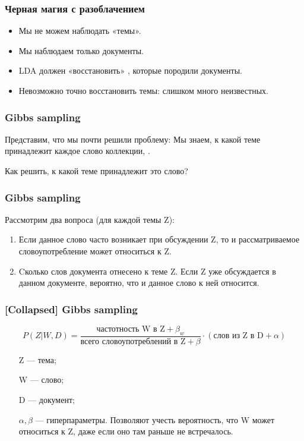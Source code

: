 \documentclass[10pt,svgnames]{beamer}
\begin{document}
\begin{frame}
  \frametitle{Черная магия с разоблачением}
  \begin{itemize}
  \item Мы не можем наблюдать «темы».
  \item Мы наблюдаем только документы.
  \item LDA должен «восстановить» , которые
    породили документы.
  \item Невозможно точно восстановить темы: слишком много неизвестных.
  \end{itemize}
\end{frame}

\begin{frame}
  \frametitle{Gibbs sampling}
  \begin{block}{Представим, что мы почти решили проблему:}
    Мы знаем, к какой теме принадлежит каждое слово коллекции,
    . 
  \end{block}
  
  Как решить, к какой теме принадлежит это слово?
\end{frame}

\begin{frame}
  \frametitle{Gibbs sampling}
  Рассмотрим два вопроса (для каждой темы Z):
  \begin{enumerate}
  \item {}

    Если данное слово часто возникает при обсуждении Z, то и
    рассматриваемое словоупотребление может относиться к Z.
  \item {} 

    Cколько слов документа отнесено к теме Z. Если Z уже обсуждается в
    данном документе, вероятно, что и данное слово к ней относится.
  \end{enumerate}
\end{frame}

\begin{frame}
  \frametitle{[Collapsed] Gibbs sampling}
  $$
  P(Z|W,D) = \frac{\text{частотность W в Z} + \beta_w}{\text{всего
      словоупотреблений в Z} + \beta} \cdot (\text{слов из Z в D} + \alpha)
  $$

  \begin{itemize}
  \item[Z] — тема;
  \item[W] — слово;
  \item[D] — документ;
  \item[$\alpha,\beta$] — гиперпараметры. Позволяют учесть вероятность,
  что W может относиться к Z, даже если оно там раньше не встречалось.
  \end{itemize}
\end{frame}
\end{document}
